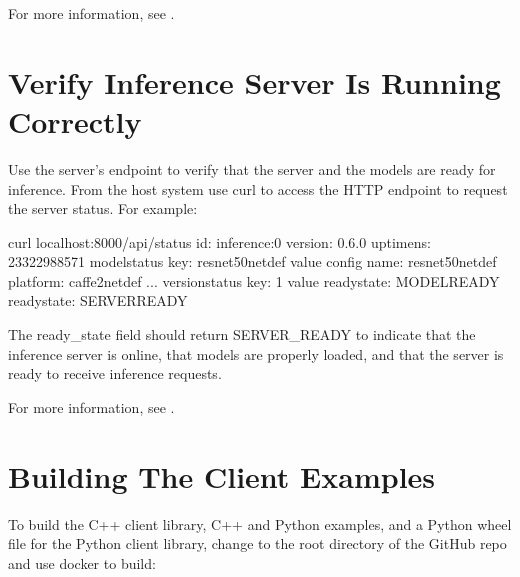 \documentclass[letterpaper,10pt,english]{sphinxmanual}
\begin{document}
For more information, see {\hyperref[\detokenize{run:section-running-the-inference-server}]{}}.


\section{Verify Inference Server Is Running Correctly}
\label{\detokenize{quickstart:verify-inference-server-is-running-correctly}}\label{\detokenize{quickstart:section-verify-inference-server-status}}
Use the server’s  endpoint to verify that the server and the
models are ready for inference.  From the host system use curl to
access the HTTP endpoint to request the server status. For example:

\begin{sphinxVerbatim}[commandchars=\\\{\}]
\PYGZdl{} curl localhost:8000/api/status
id: \PYGZdq{}inference:0\PYGZdq{}
version: \PYGZdq{}0.6.0\PYGZdq{}
uptime\PYGZus{}ns: 23322988571
model\PYGZus{}status \PYGZob{}
  key: \PYGZdq{}resnet50\PYGZus{}netdef\PYGZdq{}
  value \PYGZob{}
    config \PYGZob{}
      name: \PYGZdq{}resnet50\PYGZus{}netdef\PYGZdq{}
      platform: \PYGZdq{}caffe2\PYGZus{}netdef\PYGZdq{}
    \PYGZcb{}
    ...
    version\PYGZus{}status \PYGZob{}
      key: 1
      value \PYGZob{}
        ready\PYGZus{}state: MODEL\PYGZus{}READY
      \PYGZcb{}
    \PYGZcb{}
  \PYGZcb{}
\PYGZcb{}
ready\PYGZus{}state: SERVER\PYGZus{}READY
\end{sphinxVerbatim}

The ready\_state field should return SERVER\_READY to indicate that the
inference server is online, that models are properly loaded, and that
the server is ready to receive inference requests.

For more information, see
{\hyperref[\detokenize{run:section-checking-inference-server-status}]{}}.


\section{Building The Client Examples}
\label{\detokenize{quickstart:building-the-client-examples}}\label{\detokenize{quickstart:section-building-the-client-examples}}
To build the C++ client library, C++ and Python examples, and a Python
wheel file for the Python client library, change to the root directory
of the GitHub repo and use docker to build:
\end{document}

